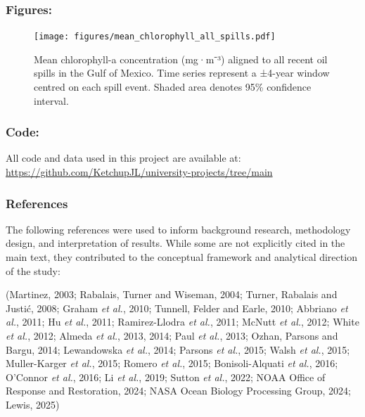 \documentclass[
  11pt,
]{article}
\begin{document}
\subsubsection{Figures:}\label{figures}

\begin{figure}[H]

{\centering \texttt{[image: figures/mean\_chlorophyll\_all\_spills.pdf]}

}

\caption{Mean chlorophyll-a concentration (mg·m⁻³) aligned to all recent
oil spills in the Gulf of Mexico. Time series represent a ±4-year window
centred on each spill event. Shaded area denotes 95\% confidence
interval.}

\end{figure}%

\subsubsection{Code:}\label{code}

All code and data used in this project are available at:
\url{https://github.com/KetchupJL/university-projects/tree/main}

\subsubsection{References}\label{references}

The following references were used to inform background research,
methodology design, and interpretation of results. While some are not
explicitly cited in the main text, they contributed to the conceptual
framework and analytical direction of the study:

(Martinez, 2003; Rabalais, Turner and Wiseman, 2004; Turner, Rabalais
and Justić, 2008; Graham \emph{et al.}, 2010; Tunnell, Felder and Earle,
2010; Abbriano \emph{et al.}, 2011; Hu \emph{et al.}, 2011;
Ramirez-Llodra \emph{et al.}, 2011; McNutt \emph{et al.}, 2012; White
\emph{et al.}, 2012; Almeda \emph{et al.}, 2013, 2014; Paul \emph{et
al.}, 2013; Ozhan, Parsons and Bargu, 2014; Lewandowska \emph{et al.},
2014; Parsons \emph{et al.}, 2015; Walsh \emph{et al.}, 2015;
Muller-Karger \emph{et al.}, 2015; Romero \emph{et al.}, 2015;
Bonisoli-Alquati \emph{et al.}, 2016; O'Connor \emph{et al.}, 2016; Li
\emph{et al.}, 2019; Sutton \emph{et al.}, 2022; NOAA Office of Response
and Restoration, 2024; NASA Ocean Biology Processing Group, 2024; Lewis,
2025)
\end{document}

